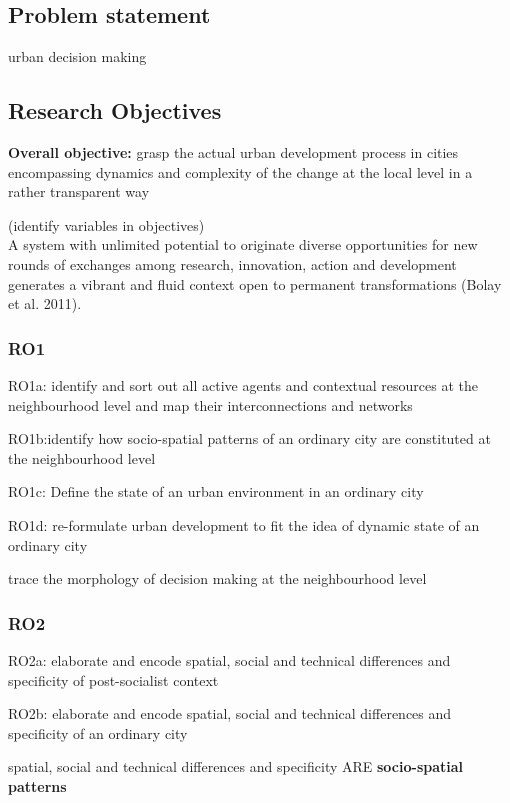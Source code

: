 \documentclass[11pt]{report}
\begin{document}
\subsection{Problem statement}
urban decision making

\subsection{Research Objectives}

\textbf{Overall objective:}
grasp the actual urban development process in cities encompassing dynamics and complexity of the change at the local level in a rather transparent way

(identify variables in objectives)
\\
A system with unlimited potential to originate diverse opportunities for new rounds of exchanges among research, innovation, action and development generates a vibrant and fluid context open to permanent transformations (Bolay et al. 2011).

\subsubsection{RO1}

RO1a: identify and sort out all active agents and contextual resources at the neighbourhood level and map their interconnections and networks 

RO1b:identify how socio-spatial patterns of an ordinary city are constituted at the neighbourhood level

RO1c: Define the state of an urban environment in an ordinary city

RO1d: re-formulate urban development to fit the idea of dynamic state of an ordinary city

trace the morphology of decision making at the neighbourhood level

\subsubsection{RO2}

RO2a: elaborate and encode spatial, social and technical differences and specificity of post-socialist context

RO2b: elaborate and encode spatial, social and technical differences and specificity of an ordinary city

spatial, social and technical differences and specificity ARE \textbf{socio-spatial patterns}
\end{document}
